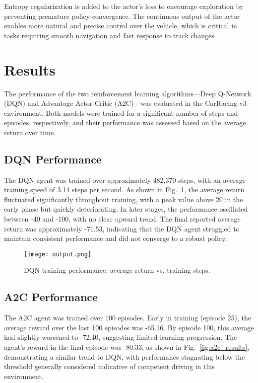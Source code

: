 \documentclass[conference]{IEEEtran}
\begin{document}
Entropy regularization is added to the actor's loss to encourage exploration by preventing premature policy convergence. The continuous output of the actor enables more natural and precise control over the vehicle, which is critical in tasks requiring smooth navigation and fast response to track changes.

\section{Results}

The performance of the two reinforcement learning algorithms—Deep Q-Network (DQN) and Advantage Actor-Critic (A2C)—was evaluated in the CarRacing-v3 environment. Both models were trained for a significant number of steps and episodes, respectively, and their performance was assessed based on the average return over time.

\subsection{DQN Performance}
The DQN agent was trained over approximately 482,370 steps, with an average training speed of 3.14 steps per second. As shown in Fig.~\ref{fig:dqn_results}, the average return fluctuated significantly throughout training, with a peak value above 20 in the early phase but quickly deteriorating. In later stages, the performance oscillated between -40 and -100, with no clear upward trend. The final reported average return was approximately -71.53, indicating that the DQN agent struggled to maintain consistent performance and did not converge to a robust policy.

\begin{figure}[h]
    \centering
    \texttt{[image: output.png]}
    \caption{DQN training performance: average return vs. training steps.}
    \label{fig:dqn_results}
\end{figure}

\subsection{A2C Performance}
The A2C agent was trained over 100 episodes. Early in training (episode 25), the average reward over the last 100 episodes was -65.16. By episode 100, this average had slightly worsened to -72.40, suggesting limited learning progression. The agent’s reward in the final episode was -80.33, as shown in Fig.~\ref{fig:a2c_results}, demonstrating a similar trend to DQN, with performance stagnating below the threshold generally considered indicative of competent driving in this environment.
\end{document}
